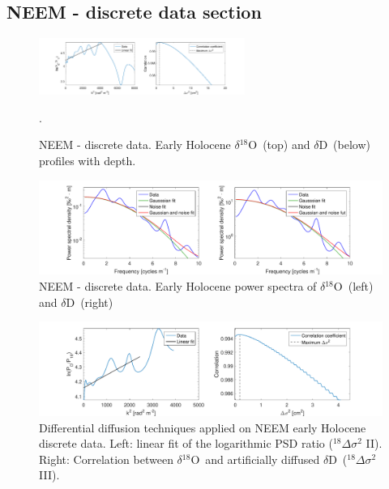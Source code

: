 \documentclass[11pt, draftcls, onecolumn]{IEEEtran} %
\numberwithin{equation}{section}
\numberwithin{table}{section}
\numberwithin{figure}{section}
\newcommand{\delOx}{$\delta{}^{18}\mathrm{O}$}
\newcommand{\delD}{$\delta\mathrm{D}$}
\begin{document}
\begin{appendices}
\subsection{NEEM - discrete data section}

\begin{figure}[H]
	\vspace*{2mm}
	\begin{center}
		\includegraphics[width=0.6\textwidth]{Figure_24}
		\caption{NEEM - discrete data. Early Holocene \delOx~(top) and \delD~(below) profiles with depth.}  \label{fig:NEEM_disc_holo}.
	\end{center}
\end{figure}


\begin{figure}[H]
	\vspace*{2mm}
	\begin{center}
		\includegraphics[width=1\textwidth]{Figure_25}
		\caption{NEEM - discrete data. Early Holocene power spectra of \delOx~(left) and \delD~(right)}  \label{fig:NEEM_dis_fig_1}
	\end{center}
\end{figure}

\begin{figure}[H]
	\vspace*{2mm}
	\begin{center}
		\includegraphics[width=1\textwidth]{Figure_26}
		\caption{Differential diffusion techniques applied on NEEM early Holocene discrete data. 
			Left: linear fit of the logarithmic PSD ratio ($^{18}\Delta\sigma^2$ II). Right: 
			Correlation between \delOx~and artificially diffused \delD~($^{18}\Delta\sigma^2$ III).}  \label{fig:NEEM_dis_fig_2}
	\end{center}
\end{figure}


\end{appendices}
\end{document}
